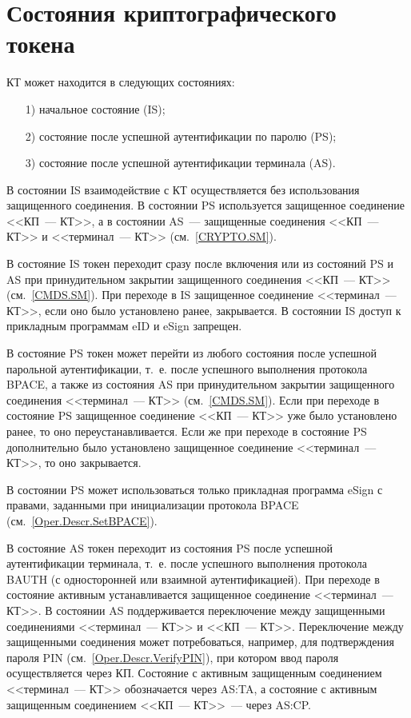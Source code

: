 \chapter{Состояния криптографического токена}\label{STATES}

КТ может находится в следующих состояниях:
%
\begin{itemize}
\item[1)]
начальное состояние (IS);
\item[2)]
состояние после успешной аутентификации по паролю (PS);
\item[3)]
состояние после успешной аутентификации терминала (AS).
\end{itemize}

В состоянии IS взаимодействие с КТ осуществляется без использования 
защищенного соединения. В состоянии PS используется 
защищенное соединение <<КП~--- КТ>>, 
а в состоянии AS~--- защищенные соединения <<КП~--- КТ>> 
и <<терминал~--- КТ>> (см.~\ref{CRYPTO.SM}).

В состояние IS токен переходит сразу после включения 
или из состояний PS и AS при принудительном закрытии защищенного соединения 
<<КП~--- КТ>> (см.~\ref{CMDS.SM}). 
%
При переходе в IS защищенное соединение <<терминал~--- КТ>>, 
если оно было установлено ранее, закрывается.
В состоянии IS доступ к прикладным программам eID и eSign запрещен.

В состояние PS токен может перейти из любого состояния 
после успешной парольной аутентификации, 
т.~е. после успешного выполнения протокола BPACE,
а также из состояния AS при принудительном закрытии 
защищенного соединения <<терминал~--- КТ>> (см.~\ref{CMDS.SM}).
Если при переходе в состояние PS защищенное соединение <<КП~--- КТ>> 
уже было установлено ранее, то оно переустанавливается. 
Если же при переходе в состояние PS дополнительно было установлено 
защищенное соединение <<терминал~--- КТ>>, то оно закрывается.

В состоянии PS может использоваться только прикладная программа eSign
с правами, заданными при инициализации протокола BPACE 
(см.~\ref{Oper.Descr.SetBPACE}).

В состояние AS токен переходит из состояния PS 
после успешной аутентификации терминала, т.~е. 
после успешного выполнения протокола BAUTH 
(с односторонней или взаимной аутентификацией).
%
При переходе в состояние активным устанавливается 
защищенное соединение <<терминал~--- КТ>>.
В состоянии AS поддерживается переключение  
между защищенными соединениями <<терминал~--- КТ>> и <<КП~--- КТ>>.
Переключение между защищенными соединения может потребоваться, 
например, для подтверждения пароля PIN (см.~\ref{Oper.Descr.VerifyPIN}), 
при котором ввод пароля осуществляется через КП. 
Состояние с активным защищенным соединением <<терминал~--- КТ>>
обозначается через AS:TA, 
а состояние с активным защищенным соединением <<КП~--- КТ>>~--- 
через AS:CP. 


